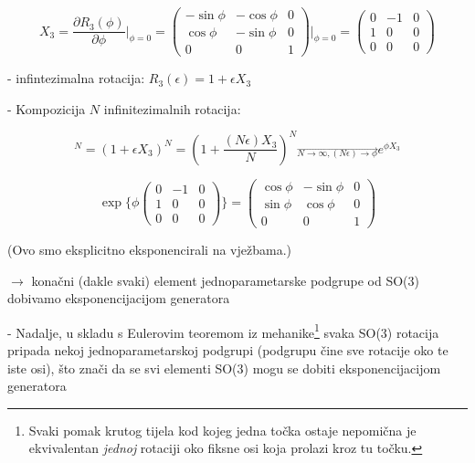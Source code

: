 \begin{displaymath}
X_3 = \frac{\partial R_3 (\phi)}{\partial \phi}\Bigg|_{\phi=0}=
\left( \begin{array}{ccc}
-\sin\phi & -\cos\phi & 0 \\
\cos\phi & -\sin\phi & 0 \\
0 & 0 & 1 
\end{array} \right)\Bigg|_{\phi=0} =
\left( \begin{array}{ccc}
0 & -1 & 0 \\
1 & 0 & 0 \\
0 & 0 & 0 
\end{array} \right)
\end{displaymath}

- infintezimalna rotacija: $R_3 (\epsilon) = 1 + \epsilon X_3$

- Kompozicija $N$ infinitezimalnih rotacija:

\begin{displaymath}
[R_3(\epsilon)]^{N} = (1+\epsilon X_3)^N = \left(1+\frac{(N\epsilon)X_3}
 {N}\right)^N \stackrel{\longrightarrow}{_{N\to\infty, (N\epsilon)\to\phi}}
 e^{\phi X_3}
\end{displaymath}

\begin{displaymath}
\exp\Bigg\{ 
\phi  \left( \begin{array}{ccc}
0 & -1 & 0 \\
1 & 0 & 0 \\
0 & 0 & 0 
\end{array} \right)\Bigg\} =\left( 
\begin{array}{ccc}
\cos\phi & -\sin\phi & 0 \\
\sin\phi & \cos\phi & 0 \\
0 & 0 & 1 
\end{array}
\right)
\end{displaymath}

(Ovo smo eksplicitno eksponencirali na vježbama.)

$\to$ konačni (dakle svaki) element jednoparametarske podgrupe
od SO(3) dobivamo eksponencijacijom generatora 

- Nadalje, u skladu s Eulerovim teoremom iz mehanike\footnote{Svaki pomak krutog
tijela kod kojeg jedna točka ostaje nepomična je ekvivalentan \emph{jednoj}
rotaciji oko fiksne osi koja prolazi kroz tu točku.} svaka SO(3) rotacija 
pripada nekoj jednoparametarskoj podgrupi
 (podgrupu čine sve rotacije oko te iste osi), što znači da se
 svi elementi SO(3) mogu se dobiti eksponencijacijom generatora


